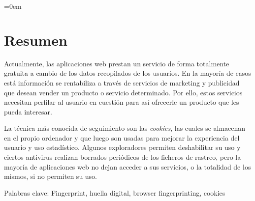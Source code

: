 \parindent=0em
\chapter{Resumen}
\noindent
Actualmente, las aplicaciones web prestan un servicio de forma totalmente gratuita a cambio de los datos recopilados de los usuarios. En la mayoría de casos está información se rentabiliza a través de servicios de marketing y publicidad que desean vender un producto o servicio determinado. Por ello, estos servicios necesitan perfilar al usuario en cuestión para así ofrecerle un producto que les pueda interesar.\par
La técnica más conocida de seguimiento son las\textit{ cookies}, las cuales se almacenan en el propio ordenador y que luego son usadas para mejorar la experiencia del usuario y uso estadístico.
Algunos exploradores permiten deshabilitar su uso y ciertos antivirus realizan borrados periódicos de los ficheros de rastreo, pero la mayoría de aplicaciones web no dejan acceder a sus servicios, o la totalidad de los mismos, si no permiten su uso.\par
\vspace{12mm}
Palabras clave: Fingerprint, huella digital, browser fingerprinting, cookies


















